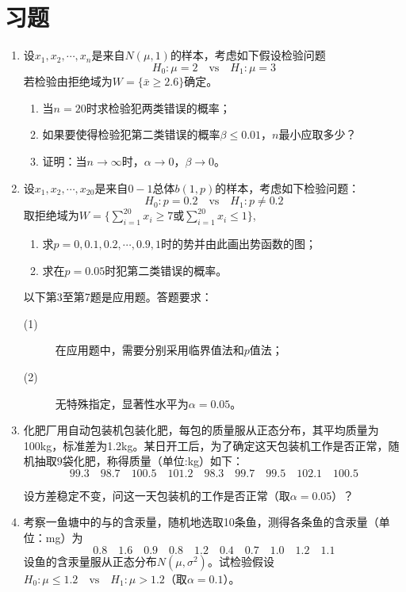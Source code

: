 \newpage
\section{习题}
\begin{enumerate}
    \item 设$x_1,x_2,\cdots,x_n$是来自$N(\mu,1)$的样本，考虑如下假设检验问题
$$
H_0:\mu = 2 \quad \text{vs} \quad H_1: \mu = 3
$$
若检验由拒绝域为$W = \{ \bar{x} \geq 2.6 \}$确定。

\begin{enumerate}
    \item 当$n=20$时求检验犯两类错误的概率；
\item 如果要使得检验犯第二类错误的概率$\beta \leq 0.01$，$n$最小应取多少？
\item 证明：当$n\rightarrow \infty$时，$\alpha \rightarrow 0$，$\beta \rightarrow 0$。
\end{enumerate}

\item  设$x_1,x_2,\cdots,x_{20}$是来自$0-1$总体$b(1,p)$的样本，考虑如下检验问题：
$$
H_0 : p = 0.2 \quad \text{vs} \quad H_1 : p \neq 0.2
$$
取拒绝域为$W = \{ \sum_{i=1}^{20} x_i \geq 7 \text{或} \sum_{i=1}^{20} x_i \leq 1 \}$,
\begin{enumerate}
    \item 求$p = 0,0.1,0.2,\cdots,0.9,1$时的势并由此画出势函数的图；
\item 求在$p = 0.05$时犯第二类错误的概率。
\end{enumerate}

\vspace{1cm}
以下第3至第7题是应用题。答题要求：
\begin{description}
    \item[(1)] 在应用题中，需要分别采用临界值法和$p$值法；
    \item[(2)] 无特殊指定，显著性水平为$\alpha = 0.05$。
\end{description}
\vspace{0.5cm}

\item 化肥厂用自动包装机包装化肥，每包的质量服从正态分布，其平均质量为100kg，标准差为1.2kg。某日开工后，为了确定这天包装机工作是否正常，随机抽取$9$袋化肥，称得质量（单位:kg）如下：
$$
99.3 \quad 98.7 \quad 100.5 \quad 101.2 \quad 
98.3 \quad 99.7 \quad 99.5 \quad 102.1 \quad 100.5
$$

设方差稳定不变，问这一天包装机的工作是否正常（取$\alpha = 0.05$）？

\item 考察一鱼塘中的与的含汞量，随机地选取10条鱼，测得各条鱼的含汞量（单位：mg）为
$$
0.8 \quad 1.6 \quad 0.9 \quad 0.8 \quad 1.2 \quad 0.4 \quad 0.7 \quad 1.0 \quad 1.2 \quad 1.1
$$
设鱼的含汞量服从正态分布$N(\mu,\sigma^2)$。试检验假设$H_0: \mu \leq 1.2\quad \text{vs}\quad H_1: \mu > 1.2$（取$\alpha=0.1$）。


\end{enumerate}
